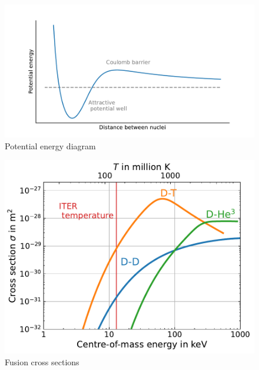 \begin{figure} [h]
    \centering
    \includegraphics[width=\linewidth]{Figures/Chapter1/potential_energy.pdf}
    \caption{Potential energy diagram}
\end{figure}


\begin{figure} [h]
    \centering
    \includegraphics[width=\linewidth]{Figures/Chapter1/cross_sections_vs_temperature__Bosch.pdf}
    \caption{Fusion cross sections}
\end{figure}

